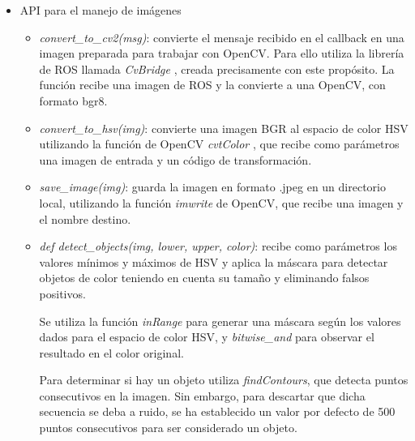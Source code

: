 \documentclass[12pt,spanish,chapterprefix, numbers=noenddot]{book}
\numberwithin{equation}{section}
\numberwithin{figure}{section}
\begin{document}
\begin{itemize}
\item{API para el manejo de imágenes}

    \begin{itemize}
    \item \textit{convert\_to\_cv2(msg)}: convierte el mensaje recibido en el callback en una imagen preparada para trabajar con OpenCV. Para ello utiliza la librería de ROS llamada \textit{CvBridge} \cite{cvbridge}, creada precisamente con este propósito. La función recibe una imagen de ROS y la convierte a una OpenCV, con formato bgr8. 
    \item \textit{convert\_to\_hsv(img)}: convierte una imagen BGR al espacio de color HSV utilizando la función de OpenCV \textit{cvtColor} \cite{cv_imgTransformations}, que recibe como parámetros una imagen de entrada y un código de transformación. 
    \item \textit{save\_image(img)}: guarda la imagen en formato .jpeg en un directorio local, utilizando la función \textit{imwrite} de OpenCV, que recibe una imagen y el nombre destino. 
    \item \textit{def detect\_objects(img, lower, upper, color)}: recibe como parámetros los valores mínimos y máximos de HSV y aplica la máscara para detectar objetos de color teniendo en cuenta su tamaño y eliminando falsos positivos. 
    
    Se utiliza la función \textit{inRange} para generar una máscara según los valores dados para el espacio de color HSV, y \textit{bitwise\_and} para observar el resultado en el color original. 
    
    Para determinar si hay un objeto utiliza \textit{findContours}, que detecta puntos consecutivos en la imagen. Sin embargo, para descartar que dicha secuencia se deba a ruido, se ha establecido un valor por defecto de 500 puntos consecutivos para ser considerado un objeto. 
    \end{itemize}
    

\end{itemize}
\end{document}
